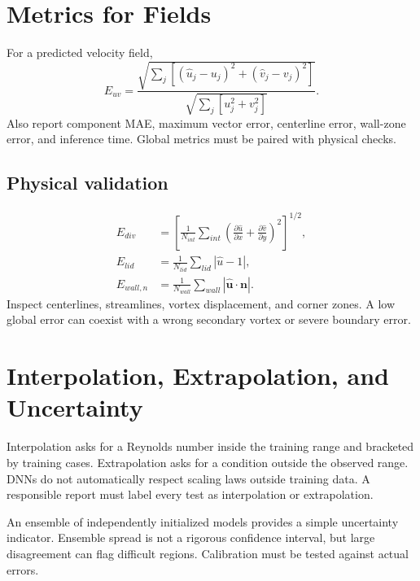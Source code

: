 \documentclass[11pt]{article}
\newcommand{\vect}[1]{\bm{#1}}
\begin{document}
\section{Metrics for Fields}
For a predicted velocity field,
\begin{equation}
E_{uv}=\frac{\sqrt{\sum_j[(\hat u_j-u_j)^2+(\hat v_j-v_j)^2]}}
{\sqrt{\sum_j[u_j^2+v_j^2]}}.
\end{equation}
Also report component MAE, maximum vector error, centerline error, wall-zone error, and inference time. Global metrics must be paired with physical checks.

\subsection{Physical validation}
\begin{align}
E_{div}&=\left[\frac{1}{N_{int}}\sum_{int}\left(\frac{\partial \hat u}{\partial x}+\frac{\partial \hat v}{\partial y}\right)^2\right]^{1/2},\\
E_{lid}&=\frac{1}{N_{lid}}\sum_{lid}|\hat u-1|,\\
E_{wall,n}&=\frac{1}{N_{wall}}\sum_{wall}|\hat{\vect{u}}\cdot\vect{n}|.
\end{align}
Inspect centerlines, streamlines, vortex displacement, and corner zones. A low global error can coexist with a wrong secondary vortex or severe boundary error.

\section{Interpolation, Extrapolation, and Uncertainty}
Interpolation asks for a Reynolds number inside the training range and bracketed by training cases. Extrapolation asks for a condition outside the observed range. DNNs do not automatically respect scaling laws outside training data. A responsible report must label every test as interpolation or extrapolation.

An ensemble of independently initialized models provides a simple uncertainty indicator. Ensemble spread is not a rigorous confidence interval, but large disagreement can flag difficult regions. Calibration must be tested against actual errors.
\end{document}
